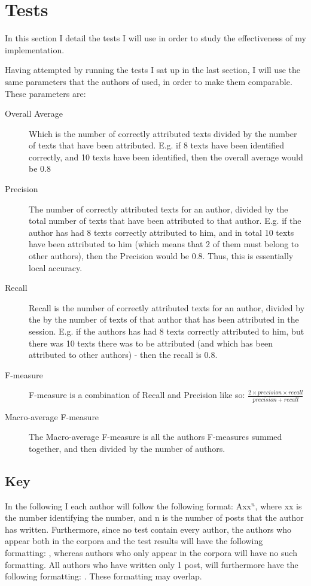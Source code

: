 \section{Tests}
\label{tests}

In this section I detail the tests I will use in order to study the effectiveness of my implementation.

Having attempted by running the tests I sat up in the last section, I will use the same parameters that the authors of \cite{nr4} used, in order to make them comparable. These parameters are: 

\begin{description}
\item[Overall Average] Which is the number of correctly attributed texts divided by the number of texts that have been attributed. E.g. if 8 texts have been identified correctly, and 10 texts have been identified, then the overall average would be 0.8 

\item[Precision] The number of correctly attributed texts for an author, divided by the total number of texts that have been attributed to that author. E.g. if the author has had 8 texts correctly attributed to him, and in total 10 texts have been attributed to him (which means that 2 of them must belong to other authors), then the Precision would be 0.8. Thus, this is essentially local accuracy.

\item[Recall] Recall is the number of correctly attributed texts for an author, divided by the by the number of texts of that author that has been attributed in the session. E.g. if the authors has had 8 texts correctly attributed to him, but there was 10 texts there was to be attributed (and which has been attributed to other authors) - then the recall is 0.8.

\item[F-measure] F-measure is a combination of Recall and Precision like so: $\frac{2 \times precision \times recall}{precision+recall}$ 

\item[Macro-average F-measure] The Macro-average F-measure is all the authors F-measures summed together, and then divided by the number of authors. 
\end{description}

\subsection*{Key}
In the following I each author will follow the following format: Axx$^{n}$, where xx is the number identifying the number, and n is the number of posts that the author has written. Furthermore, since no test contain every author, the authors who appear both in the corpora and the test results will have the following formatting: , whereas authors who only appear in the corpora will have no such formatting. All authors who have written only 1 post, will furthermore have the following formatting: . These formatting may overlap.\\

